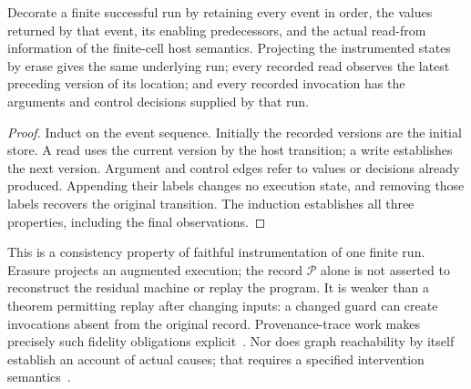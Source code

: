 \begin{proposition}
Decorate a finite successful run by retaining every event in order, the
values returned by that event, its enabling predecessors, and the actual
read-from information of the finite-cell host semantics. Projecting the
instrumented states by erase gives the same underlying run; every recorded read observes the latest
preceding version of its location; and every recorded invocation has the
arguments and control decisions supplied by that run.
\end{proposition}
\begin{proof}
Induct on the event sequence. Initially the recorded versions are the initial
store. A read uses the current version by the host transition; a write
establishes the next version. Argument and control edges refer to values or
decisions already produced. Appending their labels changes no execution
state, and removing those labels recovers the original transition. The
induction establishes all three properties, including the final observations.
\end{proof}
This is a consistency property of faithful instrumentation of one finite run.
Erasure projects an augmented execution; the record $\mathcal P$ alone is
not asserted to reconstruct the residual machine or replay the program.
It is weaker than a theorem permitting replay after changing inputs: a changed
guard can create invocations absent from the original record. Provenance-trace
work makes precisely such fidelity obligations explicit~\cite{prov-traces}.
Nor does graph reachability by itself establish an account of actual causes;
that requires a specified intervention semantics~\cite{prov-causality}.


